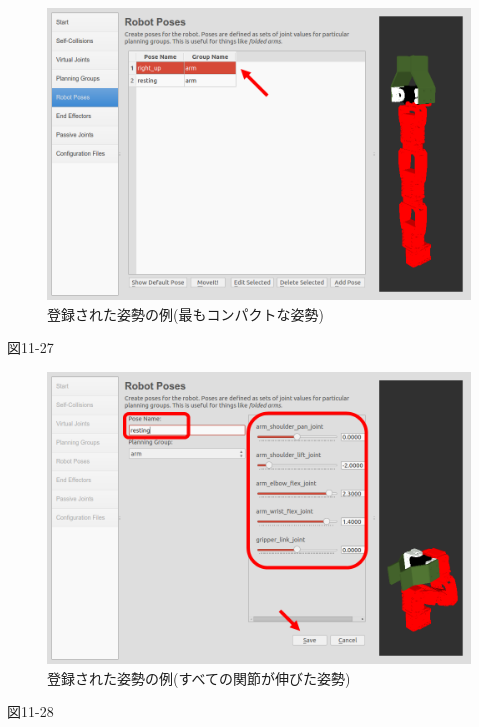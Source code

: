 \begin{figure}[ht]
  \centering
  \includegraphics[width=\columnwidth]{pictures/chapter11/pic_11_27.png}
  \caption{登録された姿勢の例(最もコンパクトな姿勢)}
\end{figure}
図11-27　

\begin{figure}[ht]
  \centering
  \includegraphics[width=\columnwidth]{pictures/chapter11/pic_11_28.png}
  \caption{登録された姿勢の例(すべての関節が伸びた姿勢)}
\end{figure}
図11-28　

